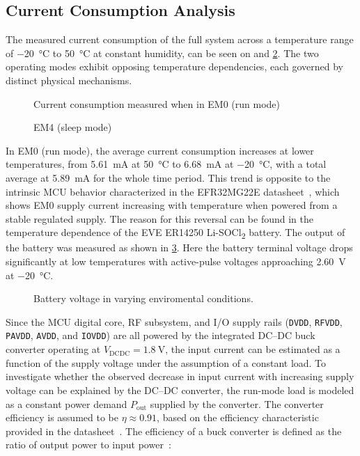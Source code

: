 \subsection{Current Consumption Analysis} \label{sec:Current_Cons}
The measured current consumption of the full system across a temperature range of \SI{-20}{\celsius} to \SI{+50}{\celsius} at constant humidity, can be seen on  and \cref{fig:sleep}. The two operating modes exhibit opposing temperature dependencies, each governed by distinct physical mechanisms.

\begin{figure}[H]
\centering

    \caption{Current consumption measured when in EM0 (run mode)}
    \label{fig:measurement}
\end{figure}

\begin{figure}[H]
\centering

    \caption{EM4 (sleep mode)}
    \label{fig:sleep}
\end{figure}

In EM0 (run mode), the average current consumption increases at lower temperatures,  from \SI{5.61}{\milli\ampere} at \SI{+50}{\celsius} to \SI{6.68}{\milli\ampere} at \SI{-20}{\celsius}, with a total average at \SI{5.89}{\milli\ampere} for the whole time period. This trend is opposite to the intrinsic MCU behavior characterized in the EFR32MG22E datasheet~\cite{EFR32MG22E}, which shows EM0 supply current increasing with temperature when powered from a stable regulated supply. The reason for this reversal can be found in the temperature dependence of the EVE ER14250 Li-SOCl\textsubscript{2} battery. The output of the battery was measured as shown in \cref{fig:FS_bat}. Here the battery terminal voltage drops significantly at low temperatures with active-pulse voltages approaching \SI{2.60}{\volt} at \SI{-20}{\celsius}.

\begin{figure}[H]
\centering

    \caption{Battery voltage in varying enviromental conditions.}
    \label{fig:FS_bat}
\end{figure}

Since the MCU digital core, RF subsystem, and I/O supply rails (\texttt{DVDD}, \texttt{RFVDD}, \texttt{PAVDD}, \texttt{AVDD}, and \texttt{IOVDD}) are all powered by the integrated DC--DC buck converter operating at \(V_{\mathrm{DCDC}}=\SI{1.8}{\volt}\), the input current can be estimated as a function of the supply voltage under the assumption of a constant load. To investigate whether the observed decrease in input current with increasing supply voltage can be explained by the DC--DC converter, the run-mode load is modeled as a constant power demand \(P_{\mathrm{out}}\) supplied by the converter. The converter efficiency is assumed to be \(\eta \approx 0.91\), based on the efficiency characteristic provided in the datasheet~\cite{EFR32MG22E}. The efficiency of a buck converter is defined as the ratio of output power to input power~\cite[p.~93]{erickson2020fundamentals}:

